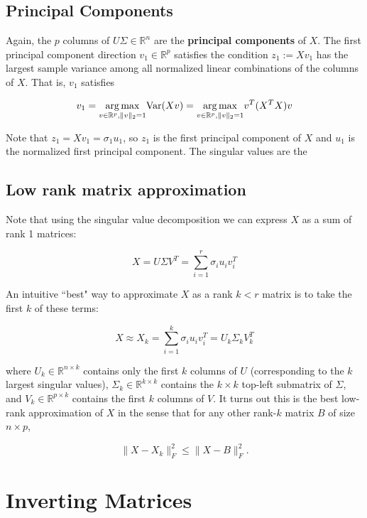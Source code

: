 \subsection{Principal Components}\label{linalg.sec.pr.comps}

Again, the \(p\) columns of \(U\Sigma \in \mathbb{R}^n\) are the \textbf{principal components} of \(X\). The first principal component direction \(v_1 \in \mathbb{R}^p\) satisfies the condition \( z_1 := X v_1 \) has the largest sample variance among all normalized linear combinations of the columns of \(X\). That is, \(v_1\) satisfies

\[
v_1 = \underset{ v \in \mathbb{R}^p, \lVert v \rVert_2 = 1}{\arg \max}  \mathrm{Var}(Xv) = \underset{ v \in \mathbb{R}^p, \lVert v \rVert_2 = 1}{\arg \max}  v^T(X^TX)v
\]

Note that \(z_1 = Xv_1 = \sigma_1 u_1\), so \(z_1\) is the first principal component of \(X\) and \(u_1\) is the normalized first principal component. The singular values are the 

\subsection{Low rank matrix approximation}

Note that using the singular value decomposition we can express \(X\) as a sum of rank 1 matrices:

\[
X =U \Sigma V^T = \sum_{i=1}^r \sigma_i  u_i v_i^T
\]

An intuitive ``best" way to approximate \(X\) as a rank \(k < r\) matrix is to take the first \(k\) of these terms:

\[
X \approx X_k = \sum_{i=1}^k \sigma_i u_i v_i^T = U_k \Sigma_k V_k^T
\]

where \(U_k \in \mathbb{R}^{n \times k}\) contains only the first \(k\) columns of \(U\) (corresponding to the \(k\) largest singular values), \(\Sigma_k \in \mathbb{R}^{k \times k}\) contains the \(k \times k\) top-left submatrix of \(\Sigma\), and \(V_k \in \mathbb{R}^{p \times k}\) contains the first \(k\) columns of \(V\). It turns out this is the best low-rank approximation of \(X\) in the sense that for any other rank-\(k\) matrix \(B\) of size \(n \times p\),

\[
\lVert X - X_k \rVert_F^2 \leq \lVert X - B \rVert_F^2 .
\]

\section{Inverting Matrices}

